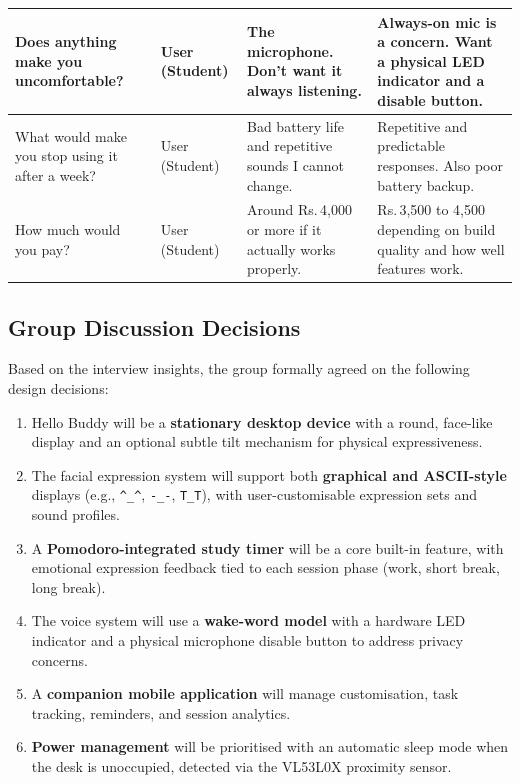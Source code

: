 \documentclass[12pt,a4paper]{article}
\begin{document}
\begin{center}
\begin{tabular}{|L{0.28\textwidth}|L{0.14\textwidth}|L{0.24\textwidth}|L{0.24\textwidth}|}
Does anything make you uncomfortable? &
User (Student) &
The microphone. Don't want it always listening. &
Always-on mic is a concern. Want a physical LED
indicator and a disable button. \\ \hline
What would make you stop using it after a week? &
User (Student) &
Bad battery life and repetitive sounds I cannot
change. &
Repetitive and predictable responses. Also poor
battery backup. \\ \hline
How much would you pay? &
User (Student) &
Around Rs.\,4{,}000 or more if it actually works
properly. &
Rs.\,3{,}500 to 4{,}500 depending on build quality
and how well features work. \\ \hline
\end{tabular}
\end{center}

\vspace{0.3cm}

\subsection*{Group Discussion Decisions}

Based on the interview insights, the group formally agreed on the
following design decisions:

\begin{enumerate}[leftmargin=*]
\item Hello Buddy will be a \textbf{stationary desktop device} with a
      round, face-like display and an optional subtle tilt mechanism
      for physical expressiveness.
\item The facial expression system will support both \textbf{graphical
      and ASCII-style} displays (e.g., \texttt{\^{}\_\^{}},
      \texttt{-\_-}, \texttt{T\_T}), with user-customisable expression
      sets and sound profiles.
\item A \textbf{Pomodoro-integrated study timer} will be a core
      built-in feature, with emotional expression feedback tied to
      each session phase (work, short break, long break).
\item The voice system will use a \textbf{wake-word model} with a
      hardware LED indicator and a physical microphone disable button
      to address privacy concerns.
\item A \textbf{companion mobile application} will manage
      customisation, task tracking, reminders, and session analytics.
\item \textbf{Power management} will be prioritised with an automatic
      sleep mode when the desk is unoccupied, detected via the
      VL53L0X proximity sensor.
\end{enumerate}
\end{document}
